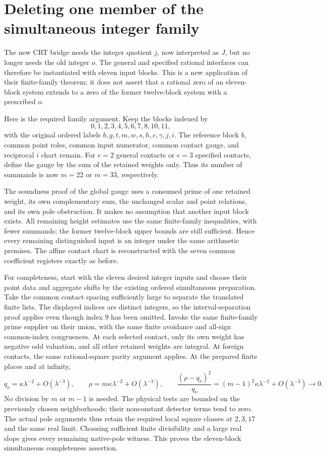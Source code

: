 \section{Deleting one member of the simultaneous integer family}
\label{sec:delete-integer-family-member}

The new CRT bridge needs the integer quotient $j$, now interpreted as
$J$, but no longer needs the old integer $o$. The general and specified
rational interfaces can therefore be instantiated with eleven input
blocks. This is a new application of their finite-family theorem; it
does not assert that a rational zero of an eleven-block system extends
to a zero of the former twelve-block system with a prescribed $o$.

Here is the required family argument. Keep the blocks indexed by
\[
              0,1,2,3,4,5,6,7,8,10,11,
\]
with the original ordered labels $b,g,t,m,w,s,h,c,\gamma,j,i$.
The reference block $b$, common point roles, common input numerator,
common contact gauge, and reciprocal $i$ chart remain. For $e=2$
general contacts or $e=3$ specified contacts, define the gauge by the
sum of the retained weights only. Thus its number of summands is now
$m=22$ or $m=33$, respectively.

The soundness proof of the global gauge uses a consumed prime of one
retained weight, its own complementary sum, the unchanged scalar and
point relations, and its own pole obstruction. It makes no assumption
that another input block exists. All remaining height estimates use
the same finite-family inequalities, with fewer summands; the former
twelve-block upper bounds are still sufficient. Hence every remaining
distinguished input is an integer under the same arithmetic premises.
The affine contact chart is reconstructed with the seven common
coefficient registers exactly as before.

For completeness, start with the eleven desired integer inputs and
choose their point data and aggregate shifts by the existing ordered
simultaneous preparation. Take the common contact spacing sufficiently
large to separate the translated finite lists. The displayed indices
are distinct integers, so the interval-separation proof applies even
though index $9$ has been omitted. Invoke the same finite-family prime
supplier on their union, with the same finite avoidance and all-sign
common-index congruences. At each selected contact, only its own weight
has negative odd valuation, and all other retained weights are integral.
At foreign contacts, the same rational-square parity argument applies.
At the prepared finite places and at infinity,
\[
 q_\nu=\kappa\lambda^{-2}+O(\lambda^{-3}),\qquad
 \rho=m\kappa\lambda^{-2}+O(\lambda^{-3}),\qquad
 \frac{(\rho-q_\nu)^2}{q_\nu}
       =(m-1)^2\kappa\lambda^{-2}+O(\lambda^{-3})\longrightarrow0.
\]
No division by $m$ or $m-1$ is needed. The physical tests are bounded
on the previously chosen neighborhoods; their nonconstant detector
terms tend to zero. The actual pole arguments thus retain the required
local square classes at $2,3,17$ and the same real limit. Choosing
sufficient finite divisibility and a large real slope gives every
remaining native-pole witness. This proves the eleven-block
simultaneous completeness assertion.

